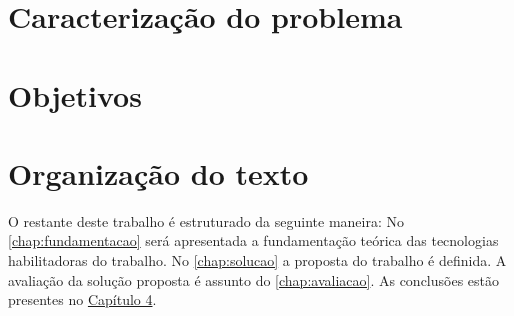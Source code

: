 \subsection{\mhubcddl{}}


\section{Caracterização do problema}


\section{Objetivos}


\section{Organização do texto}

O restante deste trabalho é estruturado da seguinte maneira: No \autoref{chap:fundamentacao} será apresentada a fundamentação teórica das tecnologias habilitadoras do trabalho. No \autoref{chap:solucao} a proposta do trabalho é definida. A avaliação da solução proposta é assunto do \autoref{chap:avaliacao}. As conclusões estão presentes no \underline{Capítulo 4}.


